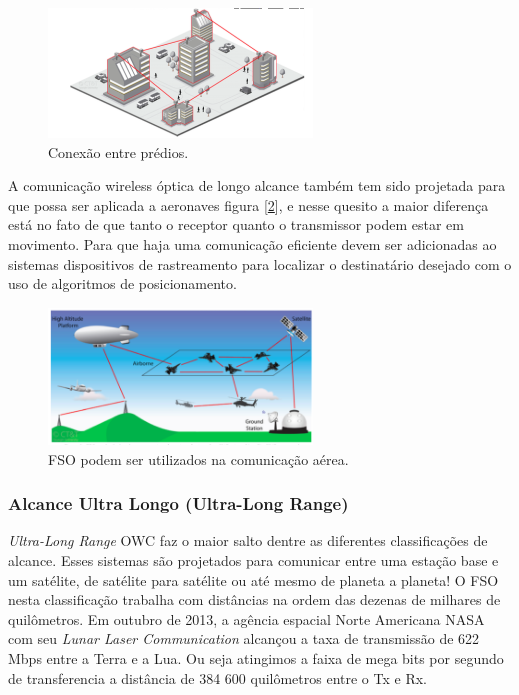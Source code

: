 \begin{figure}
	\centering
		\includegraphics[width = 7cm]{figuras/longo1}
	\caption{Conexão entre prédios.}
	\label{Fig: longo1}
\end{figure}

A comunicação wireless óptica de longo alcance também tem sido projetada para que possa ser aplicada a aeronaves figura [\ref{Fig: longo2}], e nesse quesito a maior diferença está no fato de que tanto o receptor quanto o transmissor podem estar em movimento. Para que haja uma comunicação eficiente devem ser adicionadas ao sistemas dispositivos de rastreamento para localizar o destinatário desejado com o uso de algoritmos de posicionamento. \cite{Haan}

\begin{figure}
	\centering
		\includegraphics[width = 7cm]{figuras/longo2}
	\caption{FSO podem ser utilizados na comunicação aérea.}
	\label{Fig: longo2}
\end{figure}


\subsubsection{Alcance Ultra Longo (Ultra-Long Range)}

\textit{Ultra-Long Range} OWC faz o maior salto dentre as diferentes classificações de alcance. Esses sistemas são projetados para comunicar entre uma estação base e um satélite, de satélite para satélite ou até mesmo de planeta a planeta! O FSO nesta classificação trabalha com distâncias na ordem das dezenas de milhares de quilômetros. Em outubro de 2013, a agência espacial Norte Americana NASA com seu \textit{Lunar Laser Communication} alcançou a taxa de transmissão de 622 Mbps entre a Terra e a Lua. Ou seja atingimos a faixa de mega bits por segundo de transferencia a distância de 384 600 quilômetros entre o Tx e Rx.\cite{NASA}



